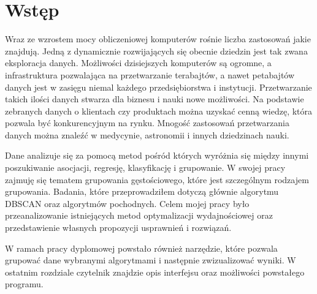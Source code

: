 \chapter{Wstęp}
Wraz ze wzrostem mocy obliczeniowej komputerów rośnie liczba zastosowań jakie znajdują. Jedną z dynamicznie rozwijających się obecnie dziedzin jest tak zwana eksploracja danych. Możliwości dzisiejszych komputerów są ogromne, a infrastruktura pozwalająca na przetwarzanie terabajtów, a nawet petabajtów danych jest w zasięgu niemal każdego przedsiębiorstwa i instytucji. Przetwarzanie takich ilości danych stwarza dla biznesu i nauki nowe możliwości. Na podstawie zebranych danych o klientach czy produktach można uzyskać cenną wiedzę, która pozwala być konkurencyjnym na rynku. Mnogość zastosowań przetwarzania danych można znaleźć w medycynie, astronomii i innych dziedzinach nauki. \par
Dane analizuje się za pomocą metod pośród których wyróżnia się między innymi poszukiwanie asocjacji, regresję, klasyfikację i grupowanie. W swojej pracy zajmuję się tematem grupowania gęstościowego, które jest szczególnym rodzajem grupowania. Badania, które przeprowadziłem dotyczą głównie algorytmu DBSCAN oraz algorytmów pochodnych. Celem mojej pracy było przeanalizowanie istniejących metod optymalizacji wydajnościowej oraz przedstawienie własnych propozycji usprawnień i rozwiązań. \par
W ramach pracy dyplomowej powstało również narzędzie, które pozwala grupować dane wybranymi algorytmami i następnie zwizualizować wyniki. W ostatnim rozdziale czytelnik znajdzie opis interfejsu oraz możliwości powstałego programu.
